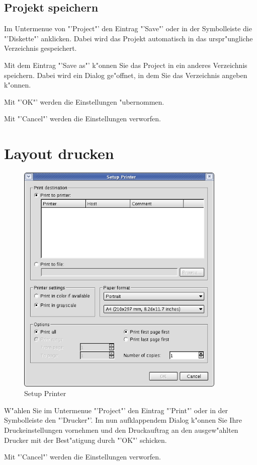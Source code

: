 \documentclass[a4paper,titlepage,12pt,ngerman]{scrbook}
\begin{document}
\subsection{Projekt speichern}
Im Untermenue von "'Project"' den Eintrag "'Save"' oder in der Symbolleiste die "'Diskette"' anklicken. Dabei wird das Projekt automatisch in das urspr"ungliche Verzeichnis gespeichert.\par
Mit dem Eintrag "'Save as"' k"onnen Sie das Project in ein anderes Verzeichnis speichern. Dabei wird ein Dialog ge"offnet, in dem Sie das Verzeichnis angeben k"onnen.\par
Mit "'OK"' werden die Einstellungen "ubernommen.\par
Mit "'Cancel"' werden die Einstellungen verworfen.\par

\section{Layout drucken}
\begin{figure}[htbp]
\begin{center}
\includegraphics[width=10cm]{Printer}
\caption{Setup Printer}\label{test}
\end{center}
\end{figure}
W"ahlen Sie im Untermenue "'Project"' den Eintrag "'Print"' oder in der Symbolleiste den "'Drucker"'. Im nun aufklappendem Dialog k"onnen Sie Ihre Druckeinstellungen vornehmen und den Druckauftrag an den ausgew"ahlten Drucker mit der Best"atigung durch "'OK"' schicken.\par
Mit "'Cancel"' werden die Einstellungen verworfen.\par
\end{document}
